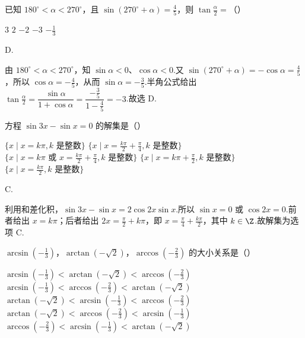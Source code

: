 \begin{problem}

已知 \(180^{\circ} < \alpha < 270^{\circ} \)，且 \(\sin(270^{\circ} + \alpha) = \frac{4}{5} \)，则 \(\tan\frac{\alpha}{2} = \)（\quad）

\choicesfive
    {\(3\)}
    {\(2\)}
    {\(-2\)}
    {\(-3\)}
    {\(-\frac{1}{3} \)}
\end{problem}

\begin{answer}
D.
\end{answer}

\begin{solution}
由 \(180^\circ<\alpha<270^\circ\)，知 \(\sin\alpha<0\)、\(\cos\alpha<0\).又
\(\sin(270^\circ+\alpha)=-\cos\alpha=\frac45\)，所以 \(\cos\alpha=-\frac45\)，从而 \(\sin\alpha=-\frac35\).半角公式给出
\(\tan\frac\alpha2=\dfrac{\sin\alpha}{1+\cos\alpha}=\dfrac{-\frac{3}{5}}{1-\frac{4}{5}}=-3\).故选 D.
\end{solution}

\begin{problem}

方程 \(\sin 3x - \sin x = 0 \) 的解集是（\quad）

\choicesfive
    {\(\{x \mid x = k\pi, k \text{ 是整数}\} \)}
    {\(\{x \mid x = \frac{k\pi}{2} + \frac{\pi}{4}, k \text{ 是整数}\} \)}
    {\(\{x \mid x = k\pi \text{\ 或\ } x = \frac{k\pi}{2} + \frac{\pi}{4}, k \text{ 是整数}\} \)}
    {\(\{x \mid x = k\pi + \frac{\pi}{2}, k \text{ 是整数}\} \)}
    {\(\{x \mid x = \frac{k\pi}{2}, k \text{ 是整数}\} \)}
\end{problem}

\begin{answer}
C.
\end{answer}

\begin{solution}
利用和差化积，\(\sin3x-\sin x=2\cos2x\sin x\).所以 \(\sin x=0\) 或 \(\cos2x=0\).前者给出 \(x=k\pi\)；后者给出 \(2x=\frac\pi2+k\pi\)，即 \(x=\frac\pi4+\frac{k\pi}{2}\)，其中 \(k\in\Z\).故解集为选项 C.
\end{solution}

\begin{problem}

\(\arcsin\left(-\frac{1}{3}\right)\)，\(\arctan\left(-\sqrt{2}\right)\)，\(\arccos\left(-\frac{2}{3}\right)\) 的大小关系是（\quad）

\choicesfive
    {\(\arcsin\left(-\frac{1}{3}\right)<\arctan\left(-\sqrt{2}\right)<\arccos\left(-\frac{2}{3}\right) \)}
    {\(\arcsin\left(-\frac{1}{3}\right)<\arccos\left(-\frac{2}{3}\right)<\arctan\left(-\sqrt{2}\right) \)}
    {\(\arctan\left(-\sqrt{2}\right)<\arcsin\left(-\frac{1}{3}\right)<\arccos\left(-\frac{2}{3}\right) \)}
    {\(\arctan\left(-\sqrt{2}\right)<\arccos\left(-\frac{2}{3}\right)<\arcsin\left(-\frac{1}{3}\right) \)}
    {\(\arccos\left(-\frac{2}{3}\right)<\arcsin\left(-\frac{1}{3}\right)<\arctan\left(-\sqrt{2}\right) \)}
\end{problem}

